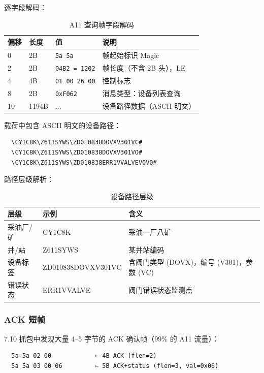 \documentclass[12pt,a4paper]{ctexart}
\newcommand{\code}[1]{\texttt{\small #1}}
\begin{document}
逐字段解码：

\begin{table}[H]\centering
\caption{A11 查询帧字段解码}
\begin{tabular}{p{2cm} p{1.5cm} p{2.5cm} p{6cm}}
\toprule
\textbf{偏移} & \textbf{长度} & \textbf{值} & \textbf{说明} \\
\midrule
0 & 2B & \code{5a 5a} & 帧起始标识 Magic \\
2 & 2B & \code{04B2 = 1202} & 帧长度（不含 2B 头），LE \\
4 & 4B & \code{01 00 26 00} & 控制标志 \\
8 & 2B & \code{0xF062} & 消息类型：设备列表查询 \\
10 & 1194B & ... & 设备路径数据（ASCII 明文） \\
\bottomrule
\end{tabular}
\end{table}

载荷中包含 ASCII 明文的设备路径：

\begin{verbatim}
  \CY1C8K\Z611SYWS\ZD010838DOVXV301VC#
  \CY1C8K\Z611SYWS\ZD010838DOVXV301VO#
  \CY1C8K\Z611SYWS\ZD010838ERR1VVALVEV0V0#
\end{verbatim}

路径层级解析：

\begin{table}[H]\centering
\caption{设备路径层级}
\begin{tabular}{p{3cm} p{3.5cm} p{6cm}}
\toprule
\textbf{层级} & \textbf{示例} & \textbf{含义} \\
\midrule
采油厂/矿 & CY1C8K & 采油一厂八矿 \\
井/站 & Z611SYWS & 某井站编码 \\
设备标签 & ZD010838DOVXV301VC & 含阀门类型 (DOVX)，编号 (V301)，参数 (VC) \\
错误状态 & ERR1VVALVE & 阀门错误状态监测点 \\
\bottomrule
\end{tabular}
\end{table}

\subsubsection{ACK 短帧}

7.10 抓包中发现大量 4--5 字节的 ACK 确认帧（99\% 的 A11 流量）：

\begin{verbatim}
  5a 5a 02 00            ← 4B ACK (flen=2)
  5a 5a 03 00 06         ← 5B ACK+status (flen=3, val=0x06)
\end{verbatim}
\end{document}
